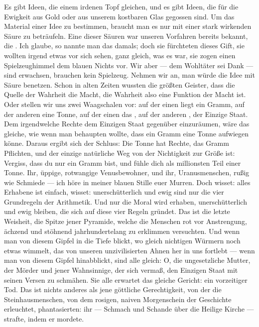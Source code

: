 Es gibt Ideen, die einem irdenen Topf gleichen, und es gibt Ideen,
die für die Ewigkeit aus Gold oder aus unserem kostbaren Glas
gegossen sind. Um das Material einer Idee zu bestimmen, braucht man
es nur mit einer stark wirkenden Säure zu beträufeln. Eine dieser
Säuren war unseren Vorfahren bereits bekannt, die . Ich glaube, so nannte man das damals; doch sie fürchteten
dieses Gift, sie wollten irgend etwas vor sich sehen, ganz gleich,
was es war, sie zogen einen Spielzeughimmel dem blauen Nichts vor.
Wir aber — dem Wohltäter sei Dank — sind erwachsen, brauchen kein
Spielzeug. Nehmen wir an, man würde die Idee  mit Säure
benetzen. Schon in alten Zeiten wussten die größten Geister, dass
die Quelle der Wahrheit die Macht, die Wahrheit also eine Funktion
der Macht ist. Oder stellen wir uns zwei Waagschalen vor: auf der
einen liegt ein Gramm, auf der anderen eine Tonne, auf der einen
das , auf der anderen , der Einzige Staat. Dem 
irgendwelche Rechte dem Einzigen Staat gegenüber einzuräumen, wäre
das gleiche, wie wenn man behaupten wollte, dass ein Gramm eine
Tonne aufwiegen könne. Daraus ergibt sich der Schluss: Die Tonne
hat Rechte, das Gramm Pflichten, und der einzige natürliche Weg von
der Nichtigkeit zur Größe ist: Vergiss, dass du nur ein Gramm bist,
und fühle dich als millionsten Teil einer Tonne. Ihr, üppige,
rotwangige Venusbewohner, und ihr, Uranusmenschen, rußig wie
Schmiede — ich höre in meiner blauen Stille euer Murren. Doch
wisset: alles Erhabene ist einfach, wisset: unerschütterlich und
ewig sind nur die vier Grundregeln der Arithmetik. Und nur die
Moral wird erhaben, unerschütterlich und ewig bleiben, die sich auf
diese vier Regeln gründet. Das ist die letzte Weisheit, die Spitze
jener Pyramide, welche die
Menschen rot vor Anstrengung, ächzend und stöhnend jahrhundertelang
zu erklimmen versuchten. Und wenn man von diesem Gipfel in die
Tiefe blickt, wo gleich nichtigen Würmern noch etwas wimmelt, das
von unseren unzivilisierten Ahnen her in uns fortlebt — wenn man
von diesem Gipfel hinabblickt, sind alle gleich: O, die
ungesetzliche Mutter, der Mörder und jener Wahnsinnige, der sich
vermaß, den Einzigen Staat mit seinen Versen zu schmähen. Sie alle
erwartet das gleiche Gericht: ein vorzeitiger Tod. Das ist nichts
anderes als jene göttliche Gerechtigkeit, von der die
Steinhausmenschen, von dem rosigen, naiven Morgenschein der
Geschichte erleuchtet, phantasierten: ihr  — Schmach und
Schande über die Heilige Kirche — strafte, indem er mordete.

